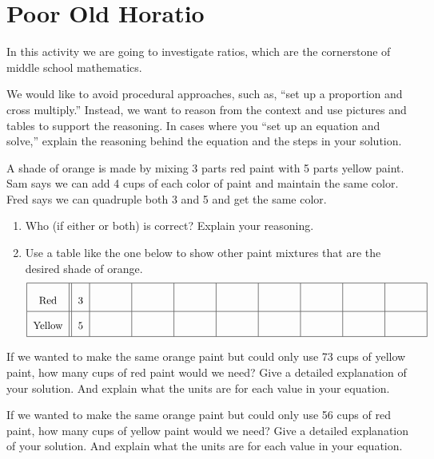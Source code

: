 \newpage
\section{Poor Old Horatio}\label{A:ratios}
In this activity we are going to investigate ratios, which are the cornerstone of middle school mathematics.  

We would like to avoid procedural approaches, such as, ``set up a proportion and cross multiply.''  Instead, we want to reason from the context and use pictures and tables to support the reasoning.  In cases where you ``set up an equation and solve,'' explain the reasoning behind the equation and the steps in your solution.  


\begin{prob}
A shade of orange is made by mixing 3 parts red paint with 5 parts
yellow paint.  Sam says we can add 4 cups of each color of paint and
maintain the same color.  Fred says we can quadruple both 3 and 5 and
get the same color.  
\begin{enumerate}
\item Who (if either or both) is correct?  Explain your reasoning.
\vspace{0.25in}

\item Use a table like the one below to show other paint mixtures that are the desired shade of orange.  
\[{\renewcommand{\arraystretch}{2}
\begin{tabular}{|c||c|c|c|c|c|c|c|c|c|}\hline
Red  &  3 &\rule[7mm]{10mm}{0mm} & \rule[7mm]{10mm}{0mm} & \rule[7mm]{10mm}{0mm}  & \rule[7mm]{10mm}{0mm}
 & \rule[7mm]{10mm}{0mm} & \rule[7mm]{10mm}{0mm} & \rule[7mm]{10mm}{0mm} & \rule[7mm]{10mm}{0mm}   \\ \hline
Yellow & 5 &  &  &  & & & & & \\ \hline
\end{tabular}}
\]
\end{enumerate}
\end{prob}


\begin{prob}
If we wanted to make the same orange paint but could only use 73 cups of yellow paint, how
many cups of red paint would we need?  Give a detailed explanation of your solution. And 
explain what the units are for each value in your equation.
\end{prob}

\vspace{0.25in}

\begin{prob}
If we wanted to make the same orange paint but could only use 56 cups of red paint, how
many cups of yellow paint would we need?  Give a detailed explanation of your solution. And 
explain what the units are for each value in your equation.
\end{prob}

